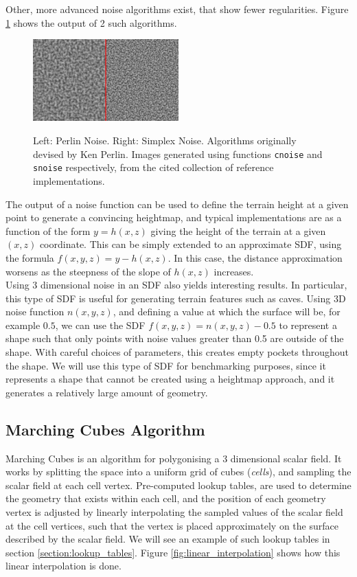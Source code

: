 \documentclass[11pt]{article}
\begin{document}
Other, more advanced noise algorithms exist, that show fewer regularities. Figure \ref{fig:better_noise} shows the output of 2 such algorithms.
\begin{figure}
  \caption{Left: Perlin Noise. Right: Simplex Noise. Algorithms originally devised by Ken Perlin\cite{PerlinChapter2N}. Images generated using functions \texttt{cnoise} and \texttt{snoise} respectively, from the cited collection of reference implementations\cite{github_2014}.}
  \includegraphics[width=0.5\textwidth]{better_noise.png}
  \label{fig:better_noise}
\end{figure}

The output of a noise function can be used to define the terrain height at a given point to generate a convincing heightmap, and typical implementations are as a function of the form $y = h\left(x,z\right)$ giving the height of the terrain at a given $\left(x,z\right)$ coordinate. This can be simply extended to an approximate SDF, using the formula $f\left(x,y,z\right) = y - h\left(x,z\right)$. In this case, the distance approximation worsens as the steepness of the slope of $h\left(x,z\right)$ increases.
\\
Using 3 dimensional noise in an SDF also yields interesting results. In particular, this type of SDF is useful for generating terrain features such as caves. Using 3D noise function $n\left(x,y,z\right)$, and defining a value at which the surface will be, for example $0.5$, we can use the SDF $f\left(x,y,z\right) = n\left(x,y,z\right) - 0.5$ to represent a shape such that only points with noise values greater than 0.5 are outside of the shape. With careful choices of parameters, this creates empty pockets throughout the shape. We will use this type of SDF for benchmarking purposes, since it represents a shape that cannot be created using a heightmap approach, and it generates a relatively large amount of geometry. 

\subsection{Marching Cubes Algorithm}
\label{section:mc}
Marching Cubes is an algorithm for polygonising a 3 dimensional scalar field. It works by splitting the space into a uniform grid of cubes (\textit{cells}), and sampling the scalar field at each cell vertex. Pre-computed lookup tables, are used to determine the geometry that exists within each cell, and the position of each geometry vertex is adjusted by linearly interpolating the sampled values of the scalar field at the cell vertices, such that the vertex is placed approximately on the surface described by the scalar field. We will see an example of such lookup tables in section \ref{section:lookup_tables}. Figure \ref{fig:linear_interpolation} shows how this linear interpolation is done.
\end{document}
